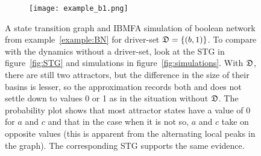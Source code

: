 \documentclass[
	digital, oneside, nosansbold, nocolorbold, nolot, nolof
]{fithesis4}
\theoremstyle{definition}
\theoremstyle{definition}
\DeclarePairedDelimiter{\set}{\{}{\}}
\begin{document}
\begin{figure}[!ht]
\centering
\begin{subfigure}{0.2\textwidth}
    \centering
\end{subfigure}
\hfill
\begin{subfigure}{0.79\textwidth}
    \centering
    \texttt{[image: example\_b1.png]}
\end{subfigure}
\caption{A state transition graph and IBMFA simulation of boolean network from
    example~\ref{example:BN} for driver-set $\dset{D} = \set{(b, 1)}$.  To
    compare with the dynamics without a driver-set, look at the STG in
    figure~\ref{fig:STG} and simulations in figure~\ref{fig:simulations}. With
    $\mathfrak{D}$, there are still two attractors, but the difference in the size
    of their basins is lesser, so the approximation records both and does not
    settle down to values 0 or 1 as in the situation without $\mathfrak{D}$. The
    probability plot shows that most attractor states have a value of 0 for $a$
    and $c$ and that in the case when it is not so, $a$ and $c$ take on
    opposite values (this is apparent from the alternating local peaks in the
    graph). The corresponding STG supports the same evidence.}
\label{fig:dset_ibmfa}
\end{figure}
\end{document}
